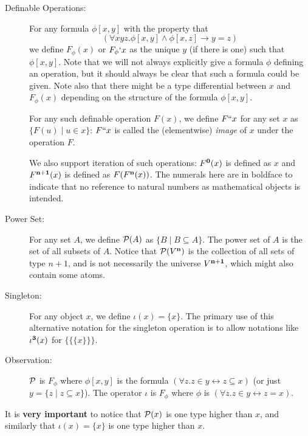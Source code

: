 \documentclass[12pt]{book}
\begin{document}
\begin{description}

\item[Definable Operations:] For any formula $\phi[x,y]$ with the
property that $$(\forall xyz.\phi[x,y] \wedge \phi[x,z] \rightarrow
y=z)$$ we define $F_{\phi}(x)$ or $F_{\phi}`x$ as the unique $y$ (if
there is one) such that $\phi[x,y]$.  Note that we will not always
explicitly give a formula $\phi$ defining an operation, but it should
always be clear that such a formula could be given.  Note also that
there might be a type differential between $x$ and $F_{\phi}(x)$
depending on the structure of the formula $\phi[x,y]$.

For any such definable operation $F(x)$, we define $F``x$ for any set
$x$ as $\{F(u)\mid u \in x\}$: $F``x$ is called the (elementwise) {\em
image\/} of $x$ under the operation $F$.

We also support iteration of such operations:  $F^{\bf 0}(x)$ is defined as
$x$ and $F^{\bf n+1}(x)$ is defined as $F(F^{\bf n}(x))$.   The numerals here are in boldface to indicate that no reference to natural numbers as mathematical objects is intended.

\item[Power Set:] For any set $A$, we define ${\cal P}(A)$ as $\{B
\mid B \subseteq A\}$.  The power set of $A$ is the set of all subsets
of $A$.  Notice that ${\cal P}(V^{\bf n})$ is the collection of all
sets of type $n+1$, and is not necessarily the universe $V^{\bf n+1}$,
which might also contain some atoms.

\item[Singleton:]  For any object $x$, we define $\iota(x)=\{x\}$.  The primary use
of this alternative notation for the singleton operation is to allow notations like $\iota^{\bf 3}(x)$ for $\{\{\{x\}\}\}$.

\item[Observation:] $\cal P$ is $F_{\phi}$ where $\phi[x,y]$ is the
formula $(\forall z.z \in y \leftrightarrow z \subseteq x)$ (or just $y = \{z
\mid z \subseteq x\}$).  The operator $\iota$ is $F_{\phi}$ where $\phi$ is $(\forall z.z \in y \leftrightarrow z=x)$.

\end{description}

It is {\bf very important} to notice that ${\cal P}(x)$ is one type
higher than $x$, and similarly that $\iota(x)=\{x\}$ is one type higher than
$x$.
\end{document}
